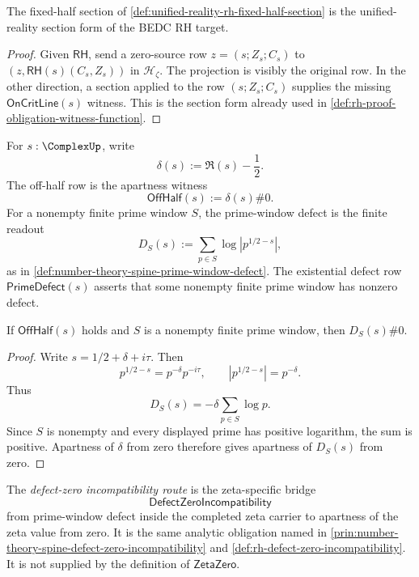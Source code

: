 \begin{theorem}
\label{thm:unified-reality-rh-fixed-half-section-equivalence}
The fixed-half section of
\autoref{def:unified-reality-rh-fixed-half-section} is the
unified-reality section form of the BEDC RH target.
\end{theorem}

\begin{proof}
Given $\mathsf{RH}$, send a zero-source row
$z=(s;Z_s;C_s)$ to $(z,\mathsf{RH}(s)(C_s,Z_s))$ in
$\mathcal H_{\zeta}$. The projection is visibly the original row. In the
other direction, a section applied to the row $(s;Z_s;C_s)$ supplies the
missing $\mathsf{OnCritLine}(s)$ witness. This is the section form
already used in
\autoref{def:rh-proof-obligation-witness-function}.
\end{proof}

\begin{definition}
\label{def:unified-reality-rh-off-half-prime-window-defect}
For $s:\ComplexUp$, write
$$
\delta(s):=\Re(s)-\frac12.
$$
The off-half row is the apartness witness
$$
\mathsf{OffHalf}(s):=\delta(s)\#0.
$$
For a nonempty finite prime window $S$, the prime-window defect is the
finite readout
$$
D_S(s):=\sum_{p\in S}\log |p^{1/2-s}|,
$$
as in \autoref{def:number-theory-spine-prime-window-defect}. The
existential defect row $\mathsf{PrimeDefect}(s)$ asserts that some
nonempty finite prime window has nonzero defect.
\end{definition}

\begin{theorem}
\label{thm:unified-reality-rh-off-half-creates-prime-defect}
If $\mathsf{OffHalf}(s)$ holds and $S$ is a nonempty finite prime
window, then $D_S(s)\#0$.
\end{theorem}

\begin{proof}
Write $s=1/2+\delta+i\tau$. Then
$$
p^{1/2-s}=p^{-\delta}p^{-i\tau},
\qquad
|p^{1/2-s}|=p^{-\delta}.
$$
Thus
$$
D_S(s)
=
-\delta\sum_{p\in S}\log p.
$$
Since $S$ is nonempty and every displayed prime has positive logarithm,
the sum is positive. Apartness of $\delta$ from zero therefore gives
apartness of $D_S(s)$ from zero.
\end{proof}

\begin{definition}
\label{def:unified-reality-rh-defect-zero-incompatibility-route}
The \emph{defect-zero incompatibility route} is the zeta-specific bridge
$$
\mathsf{DefectZeroIncompatibility}
$$
from prime-window defect inside the completed zeta carrier to apartness
of the zeta value from zero. It is the same analytic obligation named in
\autoref{prin:number-theory-spine-defect-zero-incompatibility} and
\autoref{def:rh-defect-zero-incompatibility}. It is not supplied by the
definition of $\mathsf{ZetaZero}$.
\end{definition}

